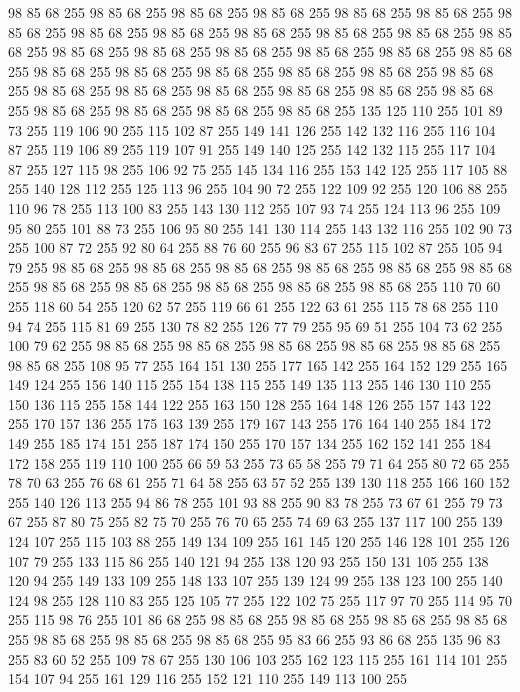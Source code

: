 98 85 68 255 98 85 68 255 98 85 68 255 98 85 68 255 98 85 68 255 98 85 68 255 98 85 68 255 98 85 68 255 98 85 68 255 98 85 68 255 98 85 68 255 98 85 68 255 98 85 68 255 98 85 68 255 98 85 68 255 98 85 68 255 98 85 68 255 98 85 68 255 98 85 68 255 98 85 68 255 98 85 68 255 98 85 68 255 98 85 68 255 98 85 68 255 98 85 68 255 98 85 68 255 98 85 68 255 98 85 68 255 98 85 68 255 98 85 68 255 98 85 68 255 98 85 68 255 98 85 68 255 98 85 68 255 98 85 68 255 135 125 110 255 101 89 73 255 119 106 90 255 115 102 87 255 149 141 126 255 142 132 116 255 116 104 87 255 119 106 89 255 119 107 91 255 149 140 125 255 142 132 115 255 117 104 87 255 127 115 98 255 106 92 75 255 145 134 116 255 153 142 125 255 117 105 88 255 140 128 112 255 125 113 96 255 104 90 72 255 122 109 92 255 120 106 88 255 110 96 78 255 113 100 83 255 143 130 112 255 107 93 74 255 124 113 96 255 109 95 80 255 101 88 73 255
106 95 80 255 141 130 114 255 143 132 116 255 102 90 73 255 100 87 72 255 92 80 64 255 88 76 60 255 96 83 67 255 115 102 87 255 105 94 79 255 98 85 68 255 98 85 68 255 98 85 68 255 98 85 68 255 98 85 68 255 98 85 68 255 98 85 68 255 98 85 68 255 98 85 68 255 98 85 68 255 98 85 68 255 110 70 60 255 118 60 54 255 120 62 57 255 119 66 61 255 122 63 61 255 115 78 68 255 110 94 74 255 115 81 69 255 130 78 82 255 126 77 79 255 95 69 51 255 104 73 62 255 100 79 62 255 98 85 68 255 98 85 68 255 98 85 68 255 98 85 68 255 98 85 68 255 98 85 68 255 108 95 77 255 164 151 130 255 177 165 142 255 164 152 129 255 165 149 124 255 156 140 115 255 154 138 115 255 149 135 113 255 146 130 110 255 150 136 115 255 158 144 122 255 163 150 128 255 164 148 126 255 157 143 122 255 170 157 136 255 175 163 139 255 179 167 143 255 176 164 140 255 184 172 149 255 185 174 151 255 187 174 150 255 170 157 134 255 162 152 141 255 184 172 158 255
119 110 100 255 66 59 53 255 73 65 58 255 79 71 64 255 80 72 65 255 78 70 63 255 76 68 61 255 71 64 58 255 63 57 52 255 139 130 118 255 166 160 152 255 140 126 113 255 94 86 78 255 101 93 88 255 90 83 78 255 73 67 61 255 79 73 67 255 87 80 75 255 82 75 70 255 76 70 65 255 74 69 63 255 137 117 100 255 139 124 107 255 115 103 88 255 149 134 109 255 161 145 120 255 146 128 101 255 126 107 79 255 133 115 86 255 140 121 94 255 138 120 93 255 150 131 105 255 138 120 94 255 149 133 109 255 148 133 107 255 139 124 99 255 138 123 100 255 140 124 98 255 128 110 83 255 125 105 77 255 122 102 75 255 117 97 70 255 114 95 70 255 115 98 76 255 101 86 68 255 98 85 68 255 98 85 68 255 98 85 68 255 98 85 68 255 98 85 68 255 98 85 68 255 98 85 68 255 95 83 66 255 93 86 68 255 135 96 83 255 83 60 52 255 109 78 67 255 130 106 103 255 162 123 115 255 161 114 101 255 154 107 94 255 161 129 116 255 152 121 110 255 149 113 100 255
